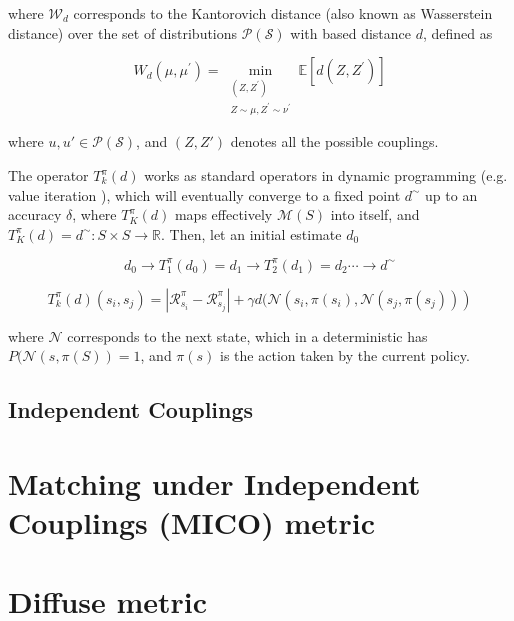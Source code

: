 where $\mathcal{W}_d$ corresponds to the Kantorovich distance (also known as Wasserstein distance) over the set of distributions $\mathcal{P}(\mathcal{S})$ with based distance $d$, defined as

\begin{equation}
W_d\left(\mu, \mu^{\prime}\right)=\min _{\substack{\left(Z, Z^{\prime}\right) \\ Z \sim \mu, Z^{\prime} \sim \nu^{\prime}}} \mathbb{E}\left[d\left(Z, Z^{\prime}\right)\right]
\end{equation}

where $u, u'\in \mathcal{P}(\mathcal{S})$, and $(Z,Z')$ denotes all the possible couplings.

The operator $T^\pi_k(d)$ works as standard operators in dynamic programming (e.g. value iteration \cite{sutton1988learning, sutton2018reinforcement}), which will eventually converge to a fixed point $d^\sim$ up to an accuracy $\delta$, where $T^\pi_K(d)$ maps effectively $\mathcal{M}(S)$ into itself, and $T^\pi_K(d) = d^\sim : S \times S \rightarrow \mathbb{R}$. Then, let an initial estimate $d_0$

$$d_0 \rightarrow T^\pi_1(d_0) = d_1 \rightarrow T^\pi_2(d_1) = d_2 \cdots \rightarrow d^\sim$$

\begin{equation}
    T^\pi_k(d)(s_i, s_j) = |\mathcal{R}^\pi_{s_i} - \mathcal{R}^\pi_{s_j}| + \gamma d(\mathcal{N}(s_i,\pi(s_i),\mathcal{N}(s_j,\pi(s_j))) 
\end{equation}

where $\mathcal{N}$ corresponds to the next state, which in a deterministic has $P(\mathcal{N}(s,\pi(S)) = 1$, and $\pi(s)$ is the action taken by the current policy.

\subsection{Independent Couplings}

\section{Matching under Independent Couplings (MICO) metric}

\section{Diffuse metric}












